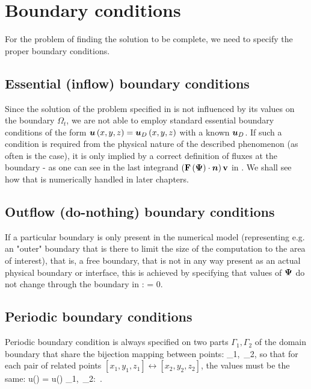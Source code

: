 \section{Boundary conditions}
\label{section:bcs}
For the problem of finding the solution  to be complete, we need to specify the proper boundary conditions.
\subsection{Essential (inflow) boundary conditions}

Since the solution  of the problem specified in  is not influenced by its values on the boundary $\Omega_t$, we are not able to employ standard essential boundary conditions of the form $\mbox{\boldmath $u$}\left(x, y, z\right) = \mbox{\boldmath $u$}_D\left(x, y, z\right)$ with a known $\mbox{\boldmath $u$}_D$.
If such a condition is required from the physical nature of the described phenomenon (as often is the case), it is only implied by a correct definition of fluxes at the boundary - as one can see in the last integrand $\left(\mathrm{\mathbf{F}}\left(\mathrm{\mathbf{\Psi}}\right) \cdot \mbox{\boldmath $n$} \right)\mathrm{\mathbf{v}}$ in . We shall see how that is numerically handled in later chapters.


\subsection{Outflow (do-nothing) boundary conditions}
If a particular boundary is only present in the numerical model (representing e.g. an "outer" boundary that is there to limit the size of the computation to the area of interest), that is, a free boundary, that is not in any way present as an actual physical boundary or interface, this is achieved by specifying that values of $\mathrm{\mathbf{\Psi}}$ do not change through the boundary in :
\be
\label{bcoutdef}
\frac{\partial\mrPsi}{\partial\bfn} = 0.
\ee

\subsection{Periodic boundary conditions}
Periodic boundary condition is always specified on two parts $\Gamma_1, \Gamma_2$ of the domain boundary that share the bijection mapping between points:
\be
\label{periodicMapping}
\left[x_1, y_1, z_1\right] \leftrightarrow \left[x_2, y_2, z_2\right] \forall \left[x_1, y_1, z_1\right] \in \Gamma_1,\ \forall \left[x_2, y_2, z_2\right] \in \Gamma_2,
\ee
so that for each pair of related points $\left[x_1, y_1, z_1\right] \leftrightarrow \left[x_2, y_2, z_2\right]$, the values must be the same:
\be
\label{periodicBCs}
u\left(\left[x_1, y_1, z_1\right]\right) = u\left(\left[x_2, y_2, z_2\right]\right) \forall \left[x_1, y_1, z_1\right] \in \Gamma_1,\ \forall \left[x_2, y_2, z_2\right] \in \Gamma_2:\, \left[x_1, y_1, z_1\right] \leftrightarrow \left[x_2, y_2, z_2\right].
\ee
